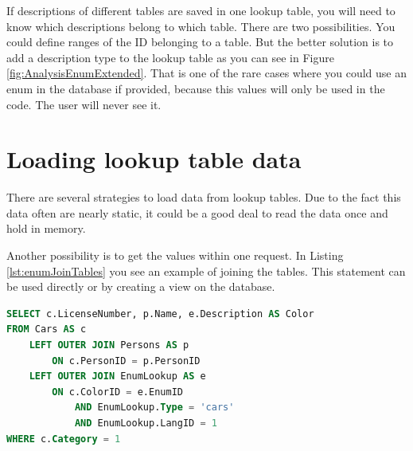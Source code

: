 		If descriptions of different tables are saved in one lookup table, you will 
		need to know which descriptions belong to which table. There are two 
		possibilities. You could define ranges of the ID belonging to a table. But 
		the better solution is to add a description type to the lookup table as you 
		can see in Figure \ref{fig:AnalysisEnumExtended}. That is one of the rare cases 
		where you could use an enum in the database if provided, because this values 
		will only be used in the code. The user will never see it.
		
		\section{Loading lookup table data}
		
		There are several strategies to load data from lookup tables. Due to the fact this 
		data often are nearly static, it could be a good deal to read the data once 
		and hold in memory. 
		
		Another possibility is to get the values within one request. In Listing \ref{lst:enumJoinTables}
		you see an example of joining the tables. This statement can be used directly or by 
		creating a view on the database.
		
		\begin{lstlisting}[float=hbt,language={SQL},caption=join tables,label=lst:enumJoinTables]
SELECT c.LicenseNumber, p.Name, e.Description AS Color
FROM Cars AS c
	LEFT OUTER JOIN Persons AS p
		ON c.PersonID = p.PersonID
	LEFT OUTER JOIN EnumLookup AS e
		ON c.ColorID = e.EnumID
			AND EnumLookup.Type = 'cars'
			AND EnumLookup.LangID = 1
WHERE c.Category = 1
		\end{lstlisting}